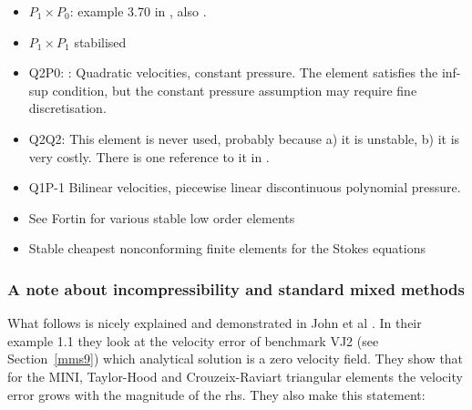 \begin{itemize}
\item $P_1\times P_0$: example 3.70 in \cite{john16}, also \cite{john98}. 
\item $P_1\times P_1$ stabilised \cite{nosi98,tasu00}
\item Q2P0: : 
Quadratic velocities, constant pressure. The element satisfies the inf-sup condition, but the constant pressure assumption may require fine discretisation.

\item Q2Q2: This element is never used, probably because a) it is unstable, b) it is very costly. 
There is one reference to it in \cite{hufb86}.
\item Q1P-1 Bilinear velocities,  piecewise linear discontinuous polynomial pressure.
\item See Fortin \cite{fort81} for various stable low order elements
\item Stable cheapest nonconforming finite elements for the Stokes equations \cite{kiys16}

\end{itemize}

\subsubsection{A note about incompressibility and standard mixed methods}

What follows is nicely explained and demonstrated in John et al \cite{jolm17}. In their 
example 1.1 they look at the velocity error of benchmark VJ2 (see Section~\ref{mms9}) 
which analytical solution is a zero velocity field. They show that for the MINI, 
Taylor-Hood and Crouzeix-Raviart triangular elements the velocity error grows 
with the magnitude of the rhs. They also make this statement:




